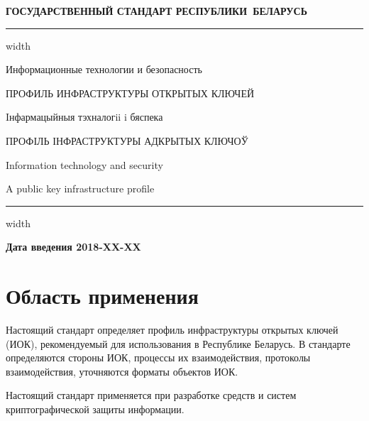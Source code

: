 \newpage
\setcounter{page}{1}
\pagestyle{headings}

\begin{center}
{\bfseries
ГОСУДАРСТВЕННЫЙ СТАНДАРТ РЕСПУБЛИКИ~БЕЛАРУСЬ
\vskip 2pt
\hrule width\textwidth

\vskip 9pt

Информационные технологии и безопасность

ПРОФИЛЬ ИНФРАСТРУКТУРЫ ОТКРЫТЫХ КЛЮЧЕЙ

\vskip 9pt

Iнфармацыйныя тэхналогii i бяспека

ПРОФІЛЬ ІНФРАСТРУКТУРЫ АДКРЫТЫХ КЛЮЧОЎ
} %

\vskip 9pt

Information technology and security

A public key infrastructure profile

\vskip 4pt                
\hrule width \textwidth
\end{center}

\mbox{}\hfill{\bfseries Дата введения 2018-XX-XX}

\chapter{Область применения}

Настоящий стандарт определяет профиль инфраструктуры открытых ключей (ИОК),
рекомендуемый для использования в Республике Беларусь.
%
В стандарте определяются стороны ИОК, процессы их взаимодействия,
протоколы взаимодействия, 
уточняются форматы объектов ИОК.

Настоящий стандарт применяется при разработке средств и систем
криптографической защиты информации. 

